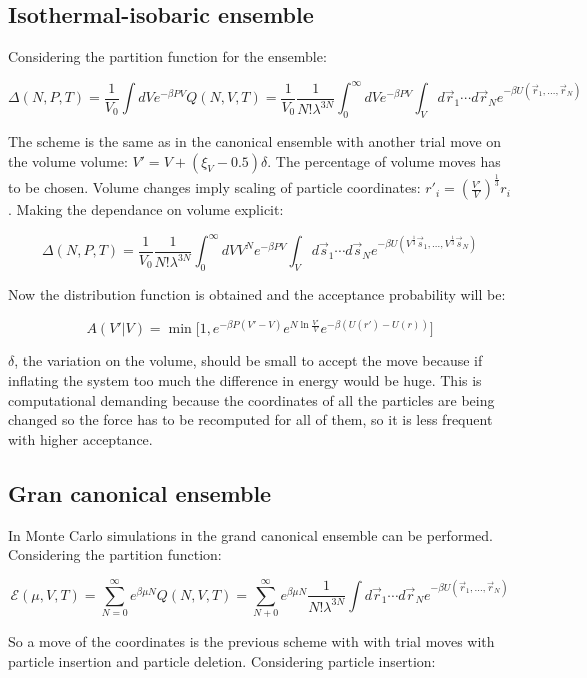 	\subsection{Isothermal-isobaric ensemble}
	Considering the partition function for the ensemble:

	$$\Delta(N, P, T) = \frac{1}{V_0} \int dVe^{-\beta PV}Q(N, V, T) = \frac{1}{V_0}\frac{1}{N!\lambda^{3N}}\int_0^{\infty}dVe^{-\beta PV}\int_Vd\vec{r}_1\cdots d\vec{r}_Ne^{-\beta U(\vec{r}_1, \dots, \vec{r}_N)}$$

	The scheme is the same as in the canonical ensemble with another trial move on the volume volume: $V' = V + (\xi_V-0.5)\delta$.
	The percentage of volume moves has to be chosen.
	Volume changes imply scaling of particle coordinates: $r'_i = \left(\frac{V'}{V}\right)^{\frac{1}{3}}r_i$.
	Making the dependance on volume explicit:

	$$\Delta(N, P, T) = \frac{1}{V_0}\frac{1}{N!\lambda^{3N}}\int_0^{\infty}dVV^Ne^{-\beta PV}\int_Vd\vec{s}_1\cdots d\vec{s}_Ne^{-\beta U\left(V^{\frac{1}{3}}\vec{s}_1,\dots, V^{\frac{1}{3}}\vec{s}_N\right)}$$

	Now the distribution function is obtained and the acceptance probability will be:

	$$A(V'|V) = \min\bigl[1, e^{-\beta P(V'-V)}e^{N\ln \frac{V'}{V}}e^{-\beta(U(r')-U(r))}\bigr]$$

	$\delta$, the variation on the volume, should be small to accept the move because if inflating the system too much the difference in energy would be huge.
	This is computational demanding because the coordinates of all the particles are being changed so the force has to be recomputed for all of them, so it is less frequent with higher acceptance.

	\subsection{Gran canonical ensemble}
	In Monte Carlo simulations in the grand canonical ensemble can be performed.
	Considering the partition function:

	$$\mathcal{E}(\mu, V, T) = \sum\limits_{N=0}^{\infty}e^{\beta\mu N}Q(N, V, T) = \sum\limits_{N+0}^{\infty}e^{\beta\mu N}\frac{1}{N!\lambda^{3N}}\int d\vec{r}_1\cdots d\vec{r}_Ne^{-\beta U(\vec{r}_1, \dots, \vec{r}_N)}$$

	So a move of the coordinates is the previous scheme with with trial moves with particle insertion and particle deletion.
	Considering particle insertion:

